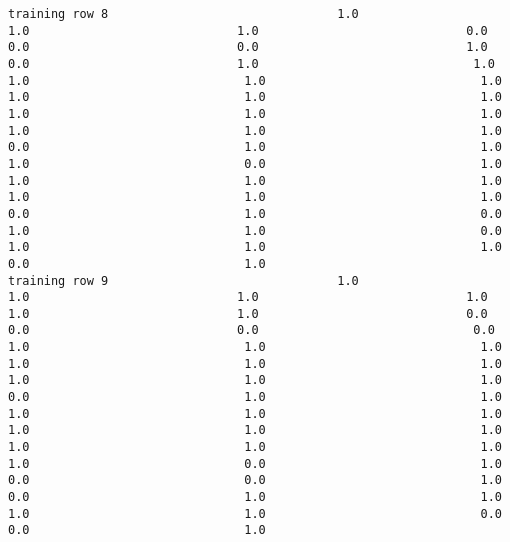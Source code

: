 \documentclass[11pt]{article}
\begin{document}
\begin{verbatim}
training row 8                                1.0                             1.0                             1.0                             0.0                             0.0                             0.0                             1.0                             0.0                             1.0                              1.0                              1.0                              1.0                              1.0                              1.0                              1.0                              1.0                              1.0                              1.0                              1.0                              1.0                              1.0                              1.0                              0.0                              1.0                              1.0                              1.0                              0.0                              1.0                              1.0                              1.0                              1.0                              1.0                              1.0                              1.0                              0.0                              1.0                              0.0                              1.0                              1.0                              0.0                              1.0                              1.0                              1.0                              0.0                              1.0
training row 9                                1.0                             1.0                             1.0                             1.0                             1.0                             1.0                             0.0                             0.0                             0.0                              0.0                              1.0                              1.0                              1.0                              1.0                              1.0                              1.0                              1.0                              1.0                              1.0                              0.0                              1.0                              1.0                              1.0                              1.0                              1.0                              1.0                              1.0                              1.0                              1.0                              1.0                              1.0                              1.0                              0.0                              1.0                              0.0                              0.0                              1.0                              0.0                              1.0                              1.0                              1.0                              1.0                              0.0                              0.0                              1.0

\end{verbatim}
\end{document}
